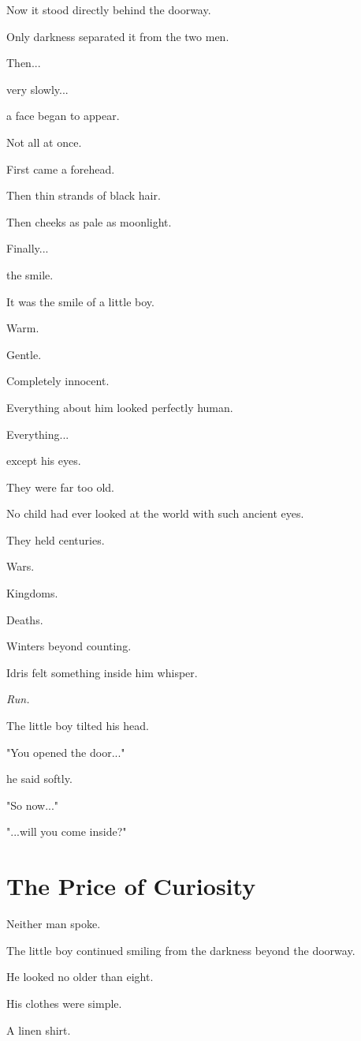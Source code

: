 \documentclass[12pt,openany]{book}
\begin{document}
Now it stood directly behind the doorway.

Only darkness separated it from the two men.

Then...

very slowly...

a face began to appear.

Not all at once.

First came a forehead.

Then thin strands of black hair.

Then cheeks as pale as moonlight.

Finally...

the smile.

It was the smile of a little boy.

Warm.

Gentle.

Completely innocent.

Everything about him looked perfectly human.

Everything...

except his eyes.

They were far too old.

No child had ever looked at the world with such ancient eyes.

They held centuries.

Wars.

Kingdoms.

Deaths.

Winters beyond counting.

Idris felt something inside him whisper.

\emph{Run.}

The little boy tilted his head.

"You opened the door..."

he said softly.

"So now..."

"...will you come inside?"
\section*{The Price of Curiosity}

Neither man spoke.

The little boy continued smiling from the darkness beyond the doorway.

He looked no older than eight.

His clothes were simple.

A linen shirt.
\end{document}
